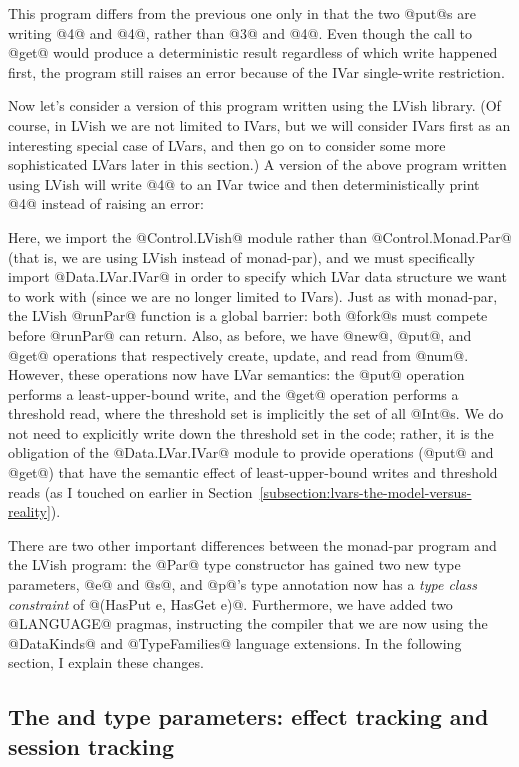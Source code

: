 This program differs from the previous one only in that the two @put@s
are writing @4@ and @4@, rather than @3@ and @4@.  Even though the
call to @get@ would produce a deterministic result regardless of which
write happened first, the program still raises an error because of the
IVar single-write restriction.

Now let's consider a version of this program written using the LVish
library.  (Of course, in LVish we are not limited to IVars, but we
will consider IVars first as an interesting special case of LVars, and
then go on to consider some more sophisticated LVars later in this
section.)  A version of the above program written using LVish will
write @4@ to an IVar twice and then deterministically print @4@
instead of raising an error:

\singlespacing

\doublespacing

Here, we import the @Control.LVish@ module rather than
@Control.Monad.Par@ (that is, we are using LVish instead of
monad-par), and we must specifically import @Data.LVar.IVar@ in order
to specify which LVar data structure we want to work with (since we
are no longer limited to IVars).  Just as with monad-par, the LVish
@runPar@ function is a global barrier: both @fork@s must compete
before @runPar@ can return.  Also, as before, we have @new@, @put@,
and @get@ operations that respectively create, update, and read from
@num@.  However, these operations now have LVar semantics: the @put@
operation performs a least-upper-bound write, and the @get@ operation
performs a threshold read, where the threshold set is implicitly the
set of all @Int@s.  We do not need to explicitly write down the
threshold set in the code; rather, it is the obligation of the
@Data.LVar.IVar@ module to provide operations (@put@ and @get@) that
have the semantic effect of least-upper-bound writes and threshold
reads (as I touched on earlier in
Section~\ref{subsection:lvars-the-model-versus-reality}).

There are two other important differences between the monad-par
program and the LVish program: the @Par@ type constructor has gained
two new type parameters, @e@ and @s@, and @p@'s type annotation now
has a \emph{type class constraint} of @(HasPut e, HasGet e)@.
Furthermore, we have added two @LANGUAGE@ pragmas, instructing the
compiler that we are now using the @DataKinds@ and @TypeFamilies@
language extensions.  In the following section, I explain these
changes.

\subsection{The  and  type parameters: effect tracking and session tracking}

